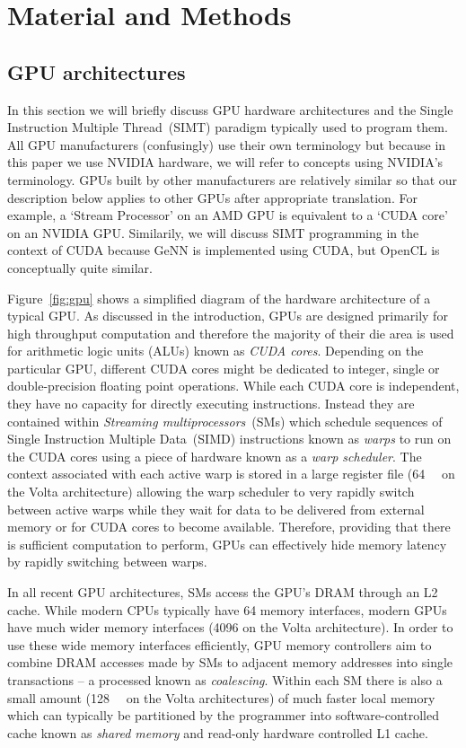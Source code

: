 \documentclass[utf8]{frontiersSCNS} %
\begin{document}
\section{Material and Methods}
\label{sec:method}
\subsection{GPU architectures}
\label{sec:method/gpu}
In this section we will briefly discuss GPU hardware architectures and the Single Instruction Multiple Thread~(SIMT) paradigm typically used to program them.
All GPU manufacturers (confusingly) use their own terminology but because in this paper we use NVIDIA hardware, we will refer to concepts using NVIDIA's terminology.
GPUs built by other manufacturers are relatively similar so that our description below applies to other GPUs after appropriate translation. For example, a `Stream Processor' on an AMD GPU is equivalent to a `CUDA core' on an NVIDIA GPU.
Similarily, we will discuss SIMT programming in the context of CUDA because GeNN is implemented using CUDA, but OpenCL is conceptually quite similar.

Figure~\ref{fig:gpu} shows a simplified diagram of the hardware architecture of a typical GPU.
As discussed in the introduction, GPUs are designed primarily for high throughput computation and therefore the majority of their die area is used for arithmetic logic units (ALUs) known as \textit{CUDA cores}.
Depending on the particular GPU, different CUDA cores might be dedicated to integer, single or double-precision floating point operations.
While each CUDA core is independent, they have no capacity for directly executing instructions.
Instead they are contained within \textit{Streaming multiprocessors}~(SMs) which schedule sequences of Single Instruction Multiple Data~(SIMD) instructions known as \textit{warps} to run on the CUDA cores using a piece of hardware known as a \textit{warp scheduler}.
The context associated with each active warp is stored in a large register file (\SI{64}{\kilo\byte} on the Volta architecture) allowing the warp scheduler to very rapidly switch between active warps while they wait for data to be delivered from external memory or for CUDA cores to become available.
Therefore, providing that there is sufficient computation to perform, GPUs can effectively hide memory latency by rapidly switching between warps.

In all recent GPU architectures, SMs access the GPU's DRAM through an L2 cache.
While modern CPUs typically have \SI{64}{\bit} memory interfaces, modern GPUs have much wider memory interfaces (\SI{4096}{\bit} on the Volta architecture).
In order to use these wide memory interfaces efficiently, GPU memory controllers aim to combine DRAM accesses made by SMs to adjacent memory addresses into single transactions -- a processed known as \textit{coalescing}.
Within each SM there is also a small amount (\SI{128}{\kilo\byte} on the Volta architectures) of much faster local memory which can typically be partitioned by the programmer into software-controlled cache known as \textit{shared memory} and read-only hardware controlled L1 cache.
\end{document}
